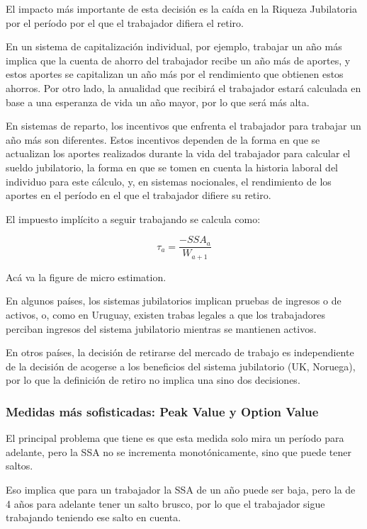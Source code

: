 \documentclass[]{article}
\begin{document}
El impacto más importante de esta decisión es la caída en la Riqueza
Jubilatoria por el período por el que el trabajador difiera el retiro.

En un sistema de capitalización individual, por ejemplo, trabajar un año
más implica que la cuenta de ahorro del trabajador recibe un año más de
aportes, y estos aportes se capitalizan un año más por el rendimiento
que obtienen estos ahorros. Por otro lado, la anualidad que recibirá el
trabajador estará calculada en base a una esperanza de vida un año
mayor, por lo que será más alta.

En sistemas de reparto, los incentivos que enfrenta el trabajador para
trabajar un año más son diferentes. Estos incentivos dependen de la
forma en que se actualizan los aportes realizados durante la vida del
trabajador para calcular el sueldo jubilatorio, la forma en que se tomen
en cuenta la historia laboral del individuo para este cálculo, y, en
sistemas nocionales, el rendimiento de los aportes en el período en el
que el trabajador difiere su retiro.

El impuesto implícito a seguir trabajando se calcula como:

\[ \tau_{a} = \frac{-SSA_{a}}{W_{a+1}} \]

Acá va la figure de micro estimation.

En algunos países, los sistemas jubilatorios implican pruebas de
ingresos o de activos, o, como en Uruguay, existen trabas legales a que
los trabajadores perciban ingresos del sistema jubilatorio mientras se
mantienen activos.

En otros países, la decisión de retirarse del mercado de trabajo es
independiente de la decisión de acogerse a los beneficios del sistema
jubilatorio (UK, Noruega), por lo que la definición de retiro no implica
una sino dos decisiones.

\subsubsection{Medidas más sofisticadas: Peak Value y Option
Value}\label{medidas-mas-sofisticadas-peak-value-y-option-value}

El principal problema que tiene es que esta medida solo mira un período
para adelante, pero la SSA no se incrementa monotónicamente, sino que
puede tener saltos.

Eso implica que para un trabajador la SSA de un año puede ser baja, pero
la de 4 años para adelante tener un salto brusco, por lo que el
trabajador sigue trabajando teniendo ese salto en cuenta.
\end{document}
